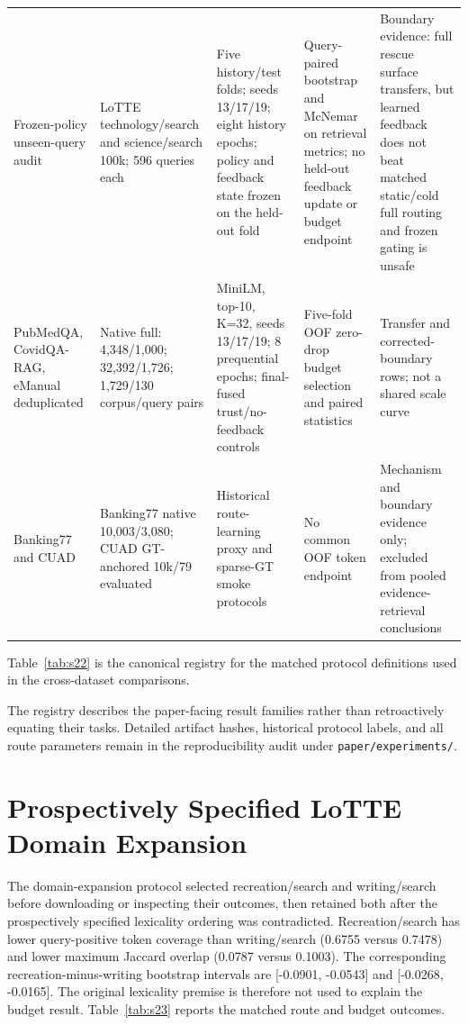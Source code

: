 \begin{table}[pos=tbp]
\begin{tabularx}{\textwidth}{>{\raggedright\arraybackslash}X>{\raggedright\arraybackslash}X>{\raggedright\arraybackslash}X>{\raggedright\arraybackslash}X>{\raggedright\arraybackslash}X}
Frozen-policy unseen-query audit & LoTTE technology/search and science/search 100k; 596 queries each & Five history/test folds; seeds 13/17/19; eight history epochs; policy and feedback state frozen on the held-out fold & Query-paired bootstrap and McNemar on retrieval metrics; no held-out feedback update or budget endpoint & Boundary evidence: full rescue surface transfers, but learned feedback does not beat matched static/cold full routing and frozen gating is unsafe \\
PubMedQA, CovidQA-RAG, eManual deduplicated & Native full: 4,348/1,000; 32,392/1,726; 1,729/130 corpus/query pairs & MiniLM, top-10, K=32, seeds 13/17/19; 8 prequential epochs; final-fused trust/no-feedback controls & Five-fold OOF zero-drop budget selection and paired statistics & Transfer and corrected-boundary rows; not a shared scale curve \\
Banking77 and CUAD & Banking77 native 10,003/3,080; CUAD GT-anchored 10k/79 evaluated & Historical route-learning proxy and sparse-GT smoke protocols & No common OOF token endpoint & Mechanism and boundary evidence only; excluded from pooled evidence-retrieval conclusions \\
\bottomrule
\end{tabularx}
\end{table}

Table~\ref{tab:s22} is the canonical registry for the matched protocol definitions used in the cross-dataset comparisons.

The registry describes the paper-facing result families rather than retroactively equating their tasks. Detailed artifact hashes, historical protocol labels, and all route parameters remain in the reproducibility audit under \nolinkurl{paper/experiments/}.

\section{Prospectively Specified LoTTE Domain Expansion}
\label{sec:12-appendix:prospectively-specified-lotte-domain-expansion}

The domain-expansion protocol selected recreation/search and writing/search before downloading or inspecting their outcomes, then retained both after the prospectively specified lexicality ordering was contradicted. Recreation/search has lower query-positive token coverage than writing/search (0.6755 versus 0.7478) and lower maximum Jaccard overlap (0.0787 versus 0.1003). The corresponding recreation-minus-writing bootstrap intervals are [-0.0901, -0.0543] and [-0.0268, -0.0165]. The original lexicality premise is therefore not used to explain the budget result. Table~\ref{tab:s23} reports the matched route and budget outcomes.

